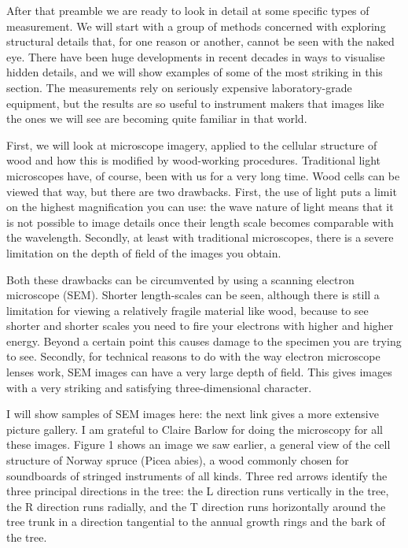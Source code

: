

  After that preamble we are ready to look in detail at some specific types of 
  measurement. We will start with a group of methods concerned with exploring 
  structural details that, for one reason or another, cannot be seen with the 
  naked eye. There have been huge developments in recent decades in ways to 
  visualise hidden details, and we will show examples of some of the most 
  striking in this section. The measurements rely on seriously expensive 
  laboratory-grade equipment, but the results are so useful to instrument 
  makers that images like the ones we will see are becoming quite familiar in 
  that world. 

  First, we will look at microscope imagery, applied to the cellular structure 
  of wood and how this is modified by wood-working procedures. Traditional 
  light microscopes have, of course, been with us for a very long time. Wood 
  cells can be viewed that way, but there are two drawbacks. First, the use of 
  light puts a limit on the highest magnification you can use: the wave nature 
  of light means that it is not possible to image details once their length 
  scale becomes comparable with the wavelength. Secondly, at least with 
  traditional microscopes, there is a severe limitation on the depth of field 
  of the images you obtain. 

  Both these drawbacks can be circumvented by using a scanning electron 
  microscope (SEM). Shorter length-scales can be seen, although there is still 
  a limitation for viewing a relatively fragile material like wood, because to 
  see shorter and shorter scales you need to fire your electrons with higher 
  and higher energy. Beyond a certain point this causes damage to the specimen 
  you are trying to see. Secondly, for technical reasons to do with the way 
  electron microscope lenses work, SEM images can have a very large depth of 
  field. This gives images with a very striking and satisfying 
  three-dimensional character. 

  I will show samples of SEM images here: the next link gives a more extensive 
  picture gallery. I am grateful to Claire Barlow for doing the microscopy for 
  all these images. Figure 1 shows an image we saw earlier, a general view of 
  the cell structure of Norway spruce (Picea abies), a wood commonly chosen for 
  soundboards of stringed instruments of all kinds. Three red arrows identify 
  the three principal directions in the tree: the L direction runs vertically 
  in the tree, the R direction runs radially, and the T direction runs 
  horizontally around the tree trunk in a direction tangential to the annual 
  growth rings and the bark of the tree. 


